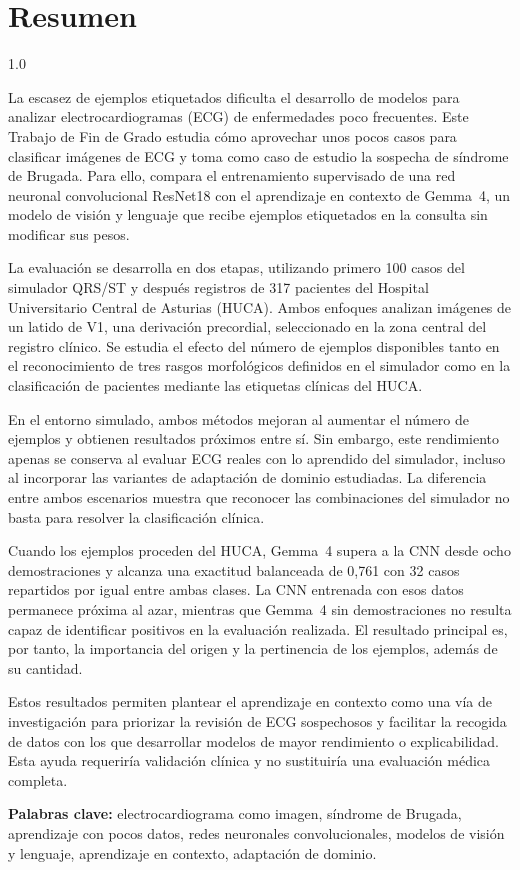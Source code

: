 \chapter*{Resumen}

\begin{spacing}{1.0}

La escasez de ejemplos etiquetados dificulta el desarrollo de modelos para analizar electrocardiogramas (ECG) de enfermedades poco frecuentes. Este Trabajo de Fin de Grado estudia cómo aprovechar unos pocos casos para clasificar imágenes de ECG y toma como caso de estudio la sospecha de síndrome de Brugada. Para ello, compara el entrenamiento supervisado de una red neuronal convolucional ResNet18 con el aprendizaje en contexto de Gemma~4, un modelo de visión y lenguaje que recibe ejemplos etiquetados en la consulta sin modificar sus pesos.

La evaluación se desarrolla en dos etapas, utilizando primero 100 casos del simulador QRS/ST y después registros de 317 pacientes del Hospital Universitario Central de Asturias (HUCA). Ambos enfoques analizan imágenes de un latido de V1, una derivación precordial, seleccionado en la zona central del registro clínico. Se estudia el efecto del número de ejemplos disponibles tanto en el reconocimiento de tres rasgos morfológicos definidos en el simulador como en la clasificación de pacientes mediante las etiquetas clínicas del HUCA.

En el entorno simulado, ambos métodos mejoran al aumentar el número de ejemplos y obtienen resultados próximos entre sí. Sin embargo, este rendimiento apenas se conserva al evaluar ECG reales con lo aprendido del simulador, incluso al incorporar las variantes de adaptación de dominio estudiadas. La diferencia entre ambos escenarios muestra que reconocer las combinaciones del simulador no basta para resolver la clasificación clínica.

Cuando los ejemplos proceden del HUCA, Gemma~4 supera a la CNN desde ocho demostraciones y alcanza una exactitud balanceada de 0,761 con 32 casos repartidos por igual entre ambas clases. La CNN entrenada con esos datos permanece próxima al azar, mientras que Gemma~4 sin demostraciones no resulta capaz de identificar positivos en la evaluación realizada. El resultado principal es, por tanto, la importancia del origen y la pertinencia de los ejemplos, además de su cantidad.

Estos resultados permiten plantear el aprendizaje en contexto como una vía de investigación para priorizar la revisión de ECG sospechosos y facilitar la recogida de datos con los que desarrollar modelos de mayor rendimiento o explicabilidad. Esta ayuda requeriría validación clínica y no sustituiría una evaluación médica completa.

\textbf{Palabras clave:} electrocardiograma como imagen, síndrome de Brugada, aprendizaje con pocos datos, redes neuronales convolucionales, modelos de visión y lenguaje, aprendizaje en contexto, adaptación de dominio.

\end{spacing}

